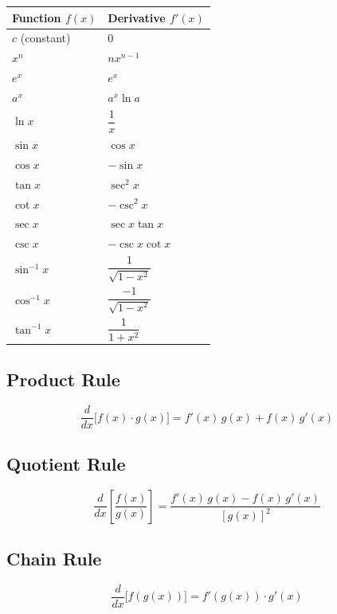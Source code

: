 \documentclass[12pt]{article}
\newcommand{\hcell}[1]{\textbf{\color{white}#1}}
\begin{document}
\begin{center}
\renewcommand{\arraystretch}{1.4}
\begin{tabular}{|C{4.5cm}|C{5cm}|}
  \hline
  \hcell{Function $f(x)$} & \hcell{Derivative $f'(x)$} \\
  \hline
  $c$ (constant) & $0$ \\
  $x^n$ & $nx^{n-1}$ \\
  $e^x$ & $e^x$ \\
  $a^x$ & $a^x \ln a$ \\
  $\ln x$ & $\dfrac{1}{x}$ \\
  $\sin x$ & $\cos x$ \\
  $\cos x$ & $-\sin x$ \\
  $\tan x$ & $\sec^2 x$ \\
  $\cot x$ & $-\csc^2 x$ \\
  $\sec x$ & $\sec x \tan x$ \\
  $\csc x$ & $-\csc x \cot x$ \\
  $\sin^{-1} x$ & $\dfrac{1}{\sqrt{1-x^2}}$ \\
  $\cos^{-1} x$ & $\dfrac{-1}{\sqrt{1-x^2}}$ \\
  $\tan^{-1} x$ & $\dfrac{1}{1+x^2}$ \\
  \hline
\end{tabular}
\end{center}

\subsection{Product Rule}
\begin{formulabox}
\[
  \frac{d}{dx}\bigl[f(x)\cdot g(x)\bigr] = f'(x)\,g(x) + f(x)\,g'(x)
\]
\end{formulabox}

\subsection{Quotient Rule}
\begin{formulabox}
\[
  \frac{d}{dx}\!\left[\frac{f(x)}{g(x)}\right] = \frac{f'(x)\,g(x) - f(x)\,g'(x)}{[g(x)]^2}
\]
\end{formulabox}

\subsection{Chain Rule}
\begin{formulabox}
\[
  \frac{d}{dx}\bigl[f(g(x))\bigr] = f'(g(x))\cdot g'(x)
\]
\end{formulabox}
\end{document}
